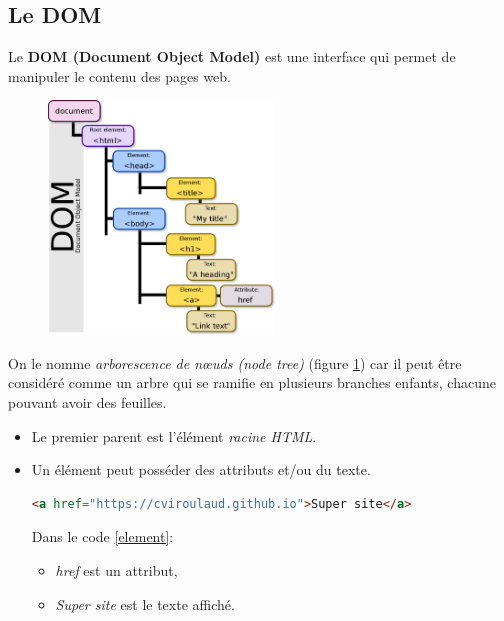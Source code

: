 \documentclass[a4paper,11pt]{article}
\begin{document}
\begin{Form}
\subsection{Le DOM}
Le \textbf{DOM (Document Object Model)} est une interface qui permet de manipuler le contenu des pages web. 
\begin{figure}[!h]
\centering
\includegraphics[width=6cm]{ressources/dom.png}
\label{dom}
\end{figure}

On le nomme \emph{arborescence de nœuds (node tree)} (figure \ref{dom}) car il peut être considéré comme un arbre qui se ramifie en plusieurs branches enfants, chacune pouvant avoir des feuilles.
\begin{itemize}
\item Le premier parent est l'élément \emph{racine HTML}.
\item Un élément peut posséder des attributs et/ou du texte.
\begin{center}
\begin{lstlisting}[language=HTML]
<a href="https://cviroulaud.github.io">Super site</a>
\end{lstlisting}
\label{element}
\end{center}
Dans le  code \ref{element}:
\begin{itemize}
\item \emph{href} est un attribut,
\item \emph{Super site} est le texte affiché.
\end{itemize}
\end{itemize}

\end{Form}
\end{document}
